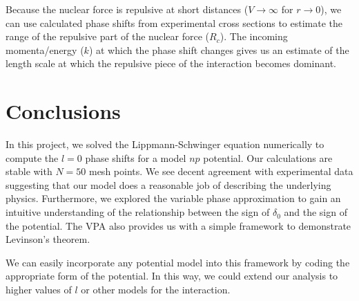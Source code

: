 \documentclass[10pt,showpacs,preprintnumbers,footinbib,amsmath,amssymb,aps,prl,twocolumn,groupedaddress,superscriptaddress,showkeys]{revtex4-1}
\begin{document}
Because the nuclear force is repulsive at short distances ($V \rightarrow \infty$ for $r \rightarrow 0$),
we can use calculated phase shifts from experimental cross sections to estimate the range
of the repulsive part of the nuclear force ($R_c$). The incoming momenta/energy ($k$) at which the
phase shift changes gives us an estimate of the length scale at which the repulsive piece of the
interaction becomes dominant.



\section{Conclusions}

In this project, we solved the Lippmann-Schwinger equation numerically to compute
the $l=0$ phase shifts for a model $np$ potential. Our calculations are stable with
$N=50$ mesh points. We see decent agreement with experimental data suggesting
that our model does a reasonable job of describing the underlying physics. Furthermore,
we explored the variable phase approximation to gain an intuitive understanding of
the relationship between the sign of $\delta_0$ and the sign of the potential. The
VPA also provides us with a simple framework to demonstrate Levinson's theorem.

We can easily incorporate any potential model into this framework by coding
the appropriate form of the potential. In this way, we could extend our analysis
to higher values of $l$ or other models for the interaction.




\end{document}
